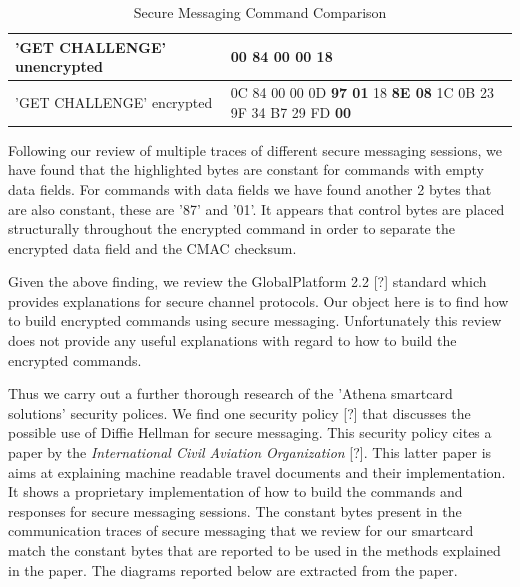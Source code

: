 \documentclass[bsc,frontabs,twoside,singlespacing,parskip,deptreport]{infthesis}     %
\begin{document}
\begin{table}[H]
\hskip-1.5cm\begin{tabular}{|l|p{10cm}|}
\hline
'GET CHALLENGE' unencrypted & 00 84 00 00 18\\
\hline
'GET CHALLENGE' encrypted & 0C 84 00 00 0D \textbf{97 01} 18 \textbf{8E 08} 1C 0B 23 9F 34 B7 29 FD \textbf{00}\\
\hline
\end{tabular}
\caption{Secure Messaging Command Comparison}
\end{table}

Following our review of multiple traces of different secure messaging sessions, we have found that the highlighted bytes are constant for commands with empty data fields. For commands with data fields we have found another 2 bytes that are also constant, these are '87' and  '01'. It appears that control bytes are placed structurally throughout the encrypted command in order to separate the encrypted data field and the CMAC checksum. 

Given the above finding, we review the GlobalPlatform 2.2 [?] standard which provides explanations for secure channel protocols. Our object here is to find how to build encrypted commands using secure messaging. Unfortunately this review does not provide any useful explanations with regard to how to build the encrypted commands. 

Thus we carry out a further thorough research of the 'Athena smartcard solutions' security polices. We find one security policy [?] that discusses the possible use of Diffie Hellman for secure messaging. This security policy cites a paper by the \textit{International Civil Aviation Organization} [?]. This latter paper is aims at explaining machine readable travel documents and their implementation. It shows a proprietary implementation of how to build the commands and responses for secure messaging sessions. The constant bytes present in the communication traces of secure messaging that we review for our smartcard match the constant bytes that are reported to be used in the methods explained in the paper. The diagrams reported below are extracted from the paper.
\end{document}
